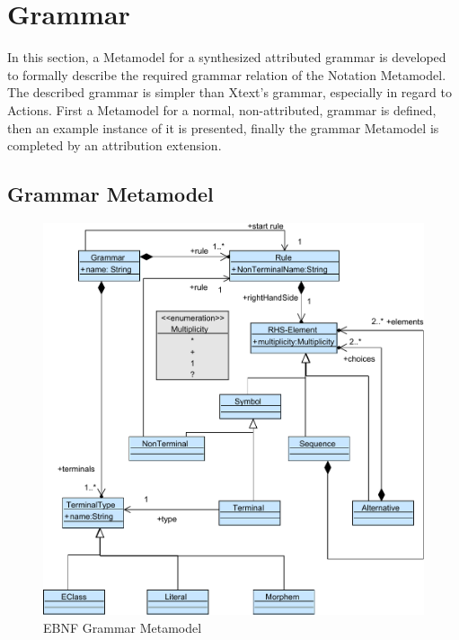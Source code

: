 \section{Grammar}
In this section, a Metamodel for a synthesized attributed grammar is developed to formally describe the required grammar relation of the Notation Metamodel. The described grammar is simpler than Xtext's grammar, especially in regard to Actions. First a Metamodel for a normal, non-attributed, grammar is defined, then an example instance of it is presented, finally the grammar Metamodel is completed by an attribution extension.

\subsection{Grammar Metamodel}
\begin{figure}
\centering
\includegraphics[scale=0.85]{gfx/ex/Grammar_CFG} 
\caption{EBNF Grammar Metamodel}
\label{MM:EBNF}
\end{figure}

